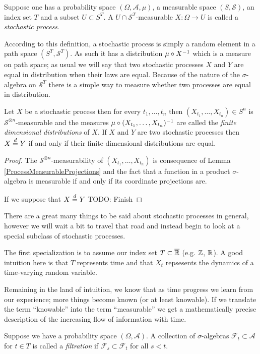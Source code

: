 \begin{defn}Suppose one has a probability space $(\Omega,
  \mathcal{A}, \mu)$, a measurable space $(S, \mathcal{S})$, an
  index set $T$ and a subset $U \subset S^T$.  A $U \cap
  \mathcal{S}^T$-measurable $X : \Omega \to U$ is called a
  \emph{stochastic process}.
\end{defn}

According to this definition, a stochastic process is simply a random
element in a path space $(S^T, \mathcal{S}^T)$.  As such it has a
distribution $\mu \circ X^{-1}$ which is a measure on path space; as usual we will say
that two stochastic processes $X$ and $Y$ are equal in distribution
when their laws are equal.  Because of the nature of the
$\sigma$-algebra on $\mathcal{S}^T$ there is a simple way to measure
whether two processes are equal in distribution.

\begin{lem}Let $X$ be a stochastic process then for every $t_1,
  \dotsc, t_n$ then $(X_{t_1}, \dotsc, X_{t_n}) \in S^n$ is
  $\mathcal{S}^{\otimes n}$-measurable and the measures
  $\mu \circ (X_{t_1}, \dotsc, X_{t_n})^{-1}$ are called the
  \emph{finite dimensional distributions} of $X$.   If $X$ and $Y$ are
  two stochastic processes then $X \overset{d}= Y$ if and only if their
  finite dimensional distributions are equal.
\end{lem}
\begin{proof}
The $\mathcal{S}^{\otimes n}$-measurability of $(X_{t_1}, \dotsc,
X_{t_n})$ is consequence of Lemma \ref{ProcessMeasurableProjections}
and the fact that a function in a product $\sigma$-algebra is
measurable if and only if its coordinate projections are.

If we suppose that $X \overset{d}= Y$ 
TODO: Finish
\end{proof}


There are a great many things to be said about stochastic processes in
general, however we will wait a bit to travel that road and instead begin to
look at a special subclass of stochastic processes.

The first specialization is to assume our index set $T \subset \overline{\mathbb{R}}$ (e.g. $\mathbb{Z}$,
$\mathbb{R}$).  A good intuition here is that $T$ represents time and that
$X_t$ repsesents the dynamics of a time-varying random variable.

Remaining in the land of intuition, we know that as time progress we
learn from our experience; more things become known (or at least
knowable).  If we translate the term ``knowable'' into the term
``measurable'' we get a mathematically precise description of the
increasing flow of information with time.
\begin{defn}Suppose we have a probability space $(\Omega,
  \mathcal{A})$.  A collection of $\sigma$-algebras $\mathcal{F}_t
  \subset \mathcal{A}$ for $t
  \in T$ is called a \emph{filtration} if $\mathcal{F}_s \subset
  \mathcal{F}_t$ for all $s < t$.
\end{defn}

